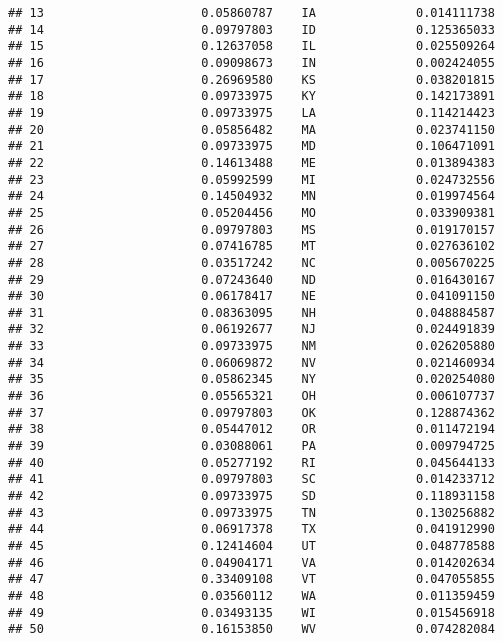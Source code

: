 \documentclass{article}\usepackage[]{graphicx}\usepackage[]{color}
\makeatletter
\newenvironment{kframe}{%
 \def\at@end@of@kframe{}%
 \ifinner\ifhmode%
  \def\at@end@of@kframe{\end{minipage}}%
  \begin{minipage}{\columnwidth}%
 \fi\fi%
 \def\FrameCommand##1{\hskip\@totalleftmargin \hskip-\fboxsep
 \colorbox{shadecolor}{##1}\hskip-\fboxsep
     \hskip-\linewidth \hskip-\@totalleftmargin \hskip\columnwidth}%
 \MakeFramed {\advance\hsize-\width
   \@totalleftmargin\z@ \linewidth\hsize
   \@setminipage}}%
 {\par\unskip\endMakeFramed%
 \at@end@of@kframe}
\newenvironment{knitrout}{}{} %
\makeatother
\begin{document}
\begin{knitrout}
\begin{kframe}
\begin{verbatim}
## 13                      0.05860787    IA              0.014111738
## 14                      0.09797803    ID              0.125365033
## 15                      0.12637058    IL              0.025509264
## 16                      0.09098673    IN              0.002424055
## 17                      0.26969580    KS              0.038201815
## 18                      0.09733975    KY              0.142173891
## 19                      0.09733975    LA              0.114214423
## 20                      0.05856482    MA              0.023741150
## 21                      0.09733975    MD              0.106471091
## 22                      0.14613488    ME              0.013894383
## 23                      0.05992599    MI              0.024732556
## 24                      0.14504932    MN              0.019974564
## 25                      0.05204456    MO              0.033909381
## 26                      0.09797803    MS              0.019170157
## 27                      0.07416785    MT              0.027636102
## 28                      0.03517242    NC              0.005670225
## 29                      0.07243640    ND              0.016430167
## 30                      0.06178417    NE              0.041091150
## 31                      0.08363095    NH              0.048884587
## 32                      0.06192677    NJ              0.024491839
## 33                      0.09733975    NM              0.026205880
## 34                      0.06069872    NV              0.021460934
## 35                      0.05862345    NY              0.020254080
## 36                      0.05565321    OH              0.006107737
## 37                      0.09797803    OK              0.128874362
## 38                      0.05447012    OR              0.011472194
## 39                      0.03088061    PA              0.009794725
## 40                      0.05277192    RI              0.045644133
## 41                      0.09797803    SC              0.014233712
## 42                      0.09733975    SD              0.118931158
## 43                      0.09733975    TN              0.130256882
## 44                      0.06917378    TX              0.041912990
## 45                      0.12414604    UT              0.048778588
## 46                      0.04904171    VA              0.014202634
## 47                      0.33409108    VT              0.047055855
## 48                      0.03560112    WA              0.011359459
## 49                      0.03493135    WI              0.015456918
## 50                      0.16153850    WV              0.074282084

\end{verbatim}
\end{kframe}
\end{knitrout}
\end{document}
